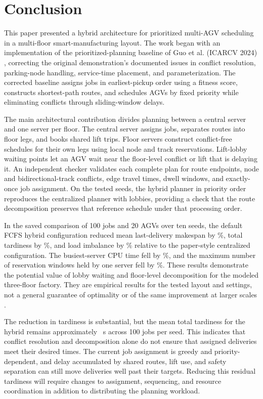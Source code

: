 \section{Conclusion}
\label{sec:conclusion}

This paper presented a hybrid architecture for prioritized multi-AGV
scheduling in a multi-floor smart-manufacturing layout. The work began with
an implementation of the prioritized-planning baseline of Guo et al.
(ICARCV 2024) \cite{guo2024}, correcting the original demonstration's documented issues in
conflict resolution, parking-node handling, service-time placement, and
parameterization. The corrected baseline assigns jobs in earliest-pickup
order using a fitness score, constructs shortest-path routes, and schedules
AGVs by fixed priority while eliminating conflicts through sliding-window
delays.

The main architectural contribution divides planning between a central
server and one server per floor. The central server assigns jobs, separates
routes into floor legs, and books shared lift trips. Floor servers construct
conflict-free schedules for their own legs using local node and track
reservations. Lift-lobby waiting points let an AGV wait near the floor-level
conflict or lift that is delaying it. An independent checker validates each
complete plan for route endpoints, node and bidirectional-track conflicts,
edge travel times, dwell windows, and exactly-once job assignment. On the
tested seeds, the hybrid planner in priority order reproduces the centralized
planner with lobbies, providing a check that the route decomposition
preserves that reference schedule under that processing order.

In the saved comparison of 100 jobs and 20 AGVs over ten seeds, the default
FCFS hybrid configuration reduced mean last-delivery makespan by
\RedMakespanCAabs\%, total tardiness by \RedTardinessCAabs\%, and load
imbalance by \RedImbalanceCAabs\% relative to the paper-style centralized
configuration. The busiest-server CPU time fell by \RedCpuMaxCAabs\%, and the
maximum number of reservation windows held by one server fell by
\RedWindowsMaxCAabs\%. These
results demonstrate the potential value of lobby waiting and floor-level
decomposition for the modeled three-floor factory. They are empirical
results for the tested layout and settings, not a general guarantee of
optimality or of the same improvement at larger scales \cite{projectRepo}.

The reduction in tardiness is substantial, but the mean total tardiness for
the hybrid remains approximately \TardinessC~s across 100 jobs per seed. This
indicates that conflict resolution and decomposition alone do not ensure
that assigned deliveries meet their desired times. The current job assignment
is greedy and priority-dependent, and delay accumulated by shared routes,
lift use, and safety separation can still move deliveries well past their
targets. Reducing this residual tardiness will require changes to assignment,
sequencing, and resource coordination in addition to distributing the
planning workload.

